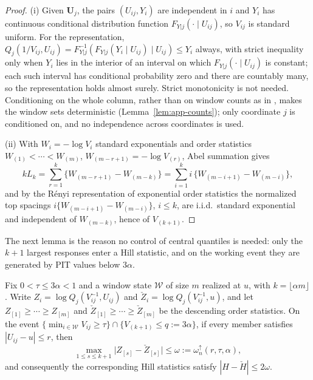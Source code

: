 \begin{proof}
(i) Given $\bm U_j$, the pairs $(U_{ij},Y_i)$ are independent in $i$ and
$Y_i$ has continuous conditional distribution function
$F_{Y|j}(\cdot\mid U_{ij})$, so $V_{ij}$ is standard uniform.  For the
representation, $Q_j(1/V_{ij},U_{ij})=F_{Y|j}^{-1}(F_{Y|j}(Y_i\mid
U_{ij})\mid U_{ij})\le Y_i$ always, with strict inequality only when
$Y_i$ lies in the interior of an interval on which
$F_{Y|j}(\cdot\mid U_{ij})$ is constant; each such interval has
conditional probability zero and there are countably many, so the
representation holds almost surely.  Strict monotonicity is not needed.
Conditioning on the whole column, rather than on window counts as in
\citet[Appendix, Lemma~4]{gardesPodgorny2025}, makes the window sets
deterministic (Lemma~\ref{lem:app-counts}); only coordinate $j$ is
conditioned on, and no independence across coordinates is used.

(ii) With $W_i=-\log V_i$ standard exponentials and order statistics
$W_{(1)}<\cdots<W_{(m)}$, $W_{(m-r+1)}=-\log V_{(r)}$, Abel summation
gives
\[
 kL_k=\sum_{r=1}^k\{W_{(m-r+1)}-W_{(m-k)}\}
 =\sum_{i=1}^k i\,\{W_{(m-i+1)}-W_{(m-i)}\},
\]
and by the R\'enyi representation of exponential order statistics
\citep{renyi1953} the normalized top spacings
$i\{W_{(m-i+1)}-W_{(m-i)}\}$, $i\le k$, are i.i.d.\ standard exponential
and independent of $W_{(m-k)}$, hence of $V_{(k+1)}$.
\end{proof}

The next lemma is the reason no control of central quantiles is needed:
only the $k+1$ largest responses enter a Hill statistic, and on the
working event they are generated by PIT values below $3\alpha$.

\begin{lemma}
\label{lem:app-tailfreeze}
Fix $0<\tau\le3\alpha<1$ and a window state $\mathcal W$ of size $m$
realized at $u$, with $k=\lfloor\alpha m\rfloor$.  Write
$Z_i=\log Q_j(V_{ij}^{-1},U_{ij})$ and
$\check Z_i=\log Q_j(V_{ij}^{-1},u)$, and let $Z_{[1]}\ge\cdots\ge Z_{[m]}$
and $\check Z_{[1]}\ge\cdots\ge\check Z_{[m]}$ be the descending order
statistics.  On the event $\{\min_{i\in\mathcal W}V_{ij}\ge\tau\}\cap
\{V_{(k+1)}\le q:=3\alpha\}$, if every member satisfies
$|U_{ij}-u|\le r$, then
\begin{equation}\label{eq:tailfreeze}
 \max_{1\le s\le k+1}\bigl|Z_{[s]}-\check Z_{[s]}\bigr|
 \le\omega:=\omega_n^{\uparrow}(r,\tau,\alpha),
\end{equation}
and consequently the corresponding Hill statistics satisfy
$|H-\check H|\le2\omega$.
\end{lemma}

